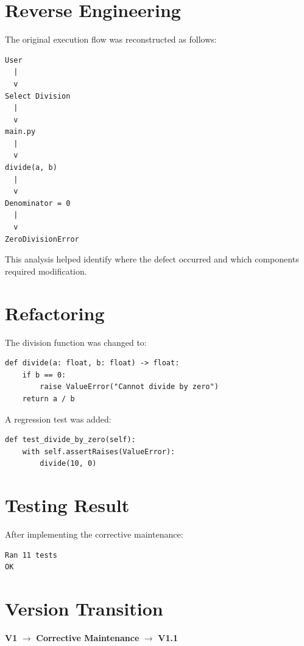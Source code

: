 \documentclass[12pt,a4paper,openany]{report}
\begin{document}
\section{Reverse Engineering}

The original execution flow was reconstructed as follows:

\begin{verbatim}
User
  |
  v
Select Division
  |
  v
main.py
  |
  v
divide(a, b)
  |
  v
Denominator = 0
  |
  v
ZeroDivisionError
\end{verbatim}

This analysis helped identify where the defect occurred and which
components required modification.

\section{Refactoring}

The division function was changed to:

\begin{lstlisting}
def divide(a: float, b: float) -> float:
    if b == 0:
        raise ValueError("Cannot divide by zero")
    return a / b
\end{lstlisting}

A regression test was added:

\begin{lstlisting}
def test_divide_by_zero(self):
    with self.assertRaises(ValueError):
        divide(10, 0)
\end{lstlisting}

\section{Testing Result}

After implementing the corrective maintenance:

\begin{verbatim}
Ran 11 tests
OK
\end{verbatim}

\section{Version Transition}

\begin{center}
\textbf{V1}
$\rightarrow$
\textbf{Corrective Maintenance}
$\rightarrow$
\textbf{V1.1}
\end{center}

\end{document}
